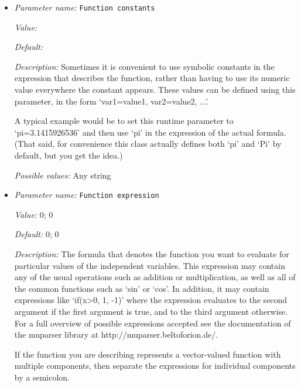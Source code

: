 \begin{itemize}
\item {\it Parameter name:} {\tt Function constants}
\label{parameters:Adiabatic conditions model/Compute profile/Surface condition function/Function constants}


{\it Value:} 


{\it Default:} 


{\it Description:} Sometimes it is convenient to use symbolic constants in the expression that describes the function, rather than having to use its numeric value everywhere the constant appears. These values can be defined using this parameter, in the form `var1=value1, var2=value2, ...'.

A typical example would be to set this runtime parameter to `pi=3.1415926536' and then use `pi' in the expression of the actual formula. (That said, for convenience this class actually defines both `pi' and `Pi' by default, but you get the idea.)


{\it Possible values:} Any string
\item {\it Parameter name:} {\tt Function expression}
\label{parameters:Adiabatic conditions model/Compute profile/Surface condition function/Function expression}


{\it Value:} 0; 0


{\it Default:} 0; 0


{\it Description:} The formula that denotes the function you want to evaluate for particular values of the independent variables. This expression may contain any of the usual operations such as addition or multiplication, as well as all of the common functions such as `sin' or `cos'. In addition, it may contain expressions like `if(x>0, 1, -1)' where the expression evaluates to the second argument if the first argument is true, and to the third argument otherwise. For a full overview of possible expressions accepted see the documentation of the muparser library at http://muparser.beltoforion.de/.

If the function you are describing represents a vector-valued function with multiple components, then separate the expressions for individual components by a semicolon.



\end{itemize}
